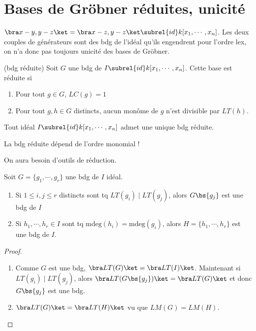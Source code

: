    \section{Bases de Gröbner réduites, unicité}
        \begin{expl}
            $\bra x-y,y-z \ket = \bra x-z, y-z \ket \subrel{id} k[x_1, \cdots, x_n]$. Les deux couples de générateurs sont des bdg de l'idéal qu'ils engendrent pour l'ordre lex, on n'a donc pas toujours unicité des bases de Gröbner.
        \end{expl}
        \begin{defi} (bdg réduite)
            Soit $G$ une bdg de $I \subrel{id} k[x_1, \cdots, x_n]$. Cette base est réduite si
            \begin{enumerate}
                \item Pour tout $g \in G$, $LC(g) = 1$
                \item Pour tout $g,h \in G$ distincts, aucun monôme de $g$ n'est divisible par $LT(h)$.
            \end{enumerate}
        \end{defi}
        \begin{theo}
            \label{1.5.1}
            Tout idéal $I \subrel{id} k[x_1, \cdots, x_n]$ admet une unique bdg réduite.
        \end{theo}
        \begin{remq}
            La bdg réduite dépend de l'ordre monomial !
        \end{remq}
        On aura besoin d'outils de réduction.
        \begin{lemm}
            Soit $G = \{g_1, \cdots, g_r\}$ une bdg de $I$ idéal.
            \begin{enumerate}
                \item Si $1 \leq i,j \leq r$ distincts sont tq $LT(g_i) \mid LT(g_j)$, alors $G \bs \{g_j\}$ est une bdg de $I$
                \item Si $h_1, \cdots, h_r \in I$ sont tq $\mathrm{mdeg}(h_i) = \mathrm{mdeg}(g_i)$, alors $H = \{h_1, \cdots, h_r\}$ est une bdg de $I$.
            \end{enumerate}
        \end{lemm}
        \begin{proof}
            \begin{enumerate}
                \item Comme $G$ est une bdg, $\bra LT(G) \ket = \bra LT(I) \ket$. Maintenant si $LT(g_i) \mid LT(g_j)$, alors $\bra LT(G \bs \{g_j\}) \ket = \bra LT(G) \ket$ et donc $G \bs \{g_j\}$ est une bdg.
                \item $\bra LT(G) \ket = \bra LT(H) \ket$ vu que $LM(G) = LM(H)$.
            \end{enumerate}
        \end{proof}
